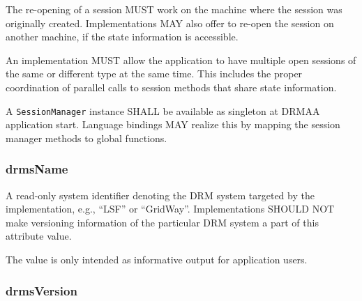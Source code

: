 \documentclass{article}
\newcommand{\h}[1]{\lstinline|#1|}
\newcommand{\langbind}[1]{\begin{shaded}#1\end{shaded}}
\newcommand{\rat}[1]{}
\begin{document}
The re-opening of a session MUST work on the machine where the session was originally created. Implementations MAY also offer to re-open the session on another machine, if the state information is accessible. 

An implementation MUST allow the application to have multiple open sessions of the same or different type at the same time. This includes the proper coordination of parallel calls to session methods that share state information.

\langbind{
A \h{SessionManager} instance SHALL be available as singleton at DRMAA application start. Language bindings MAY realize this by mapping the session manager methods to global functions. 
}

\rat{
Comparison to DRMAA 1.0:
The concept of a factory from GFD.130 was removed (solves issue \#6276). Version 2.0 of DRMAA supports restartable sessions by the newly introduced SessionManager interface. It allows creating multiple concurrent sessions for job submission (solves issue \#2821), which can be restarted by their generated session name (solves issue \#2820). Session.init() and Session.exit() functionalities are moved to the according session creation and closing routines. The descriptions were fixed accordingly (solves issue \#2822). The AlreadyActiveSession error was removed. (F2F meeting July 2009) The drmaaImplementation attribute from DRMAA 1.0 was removed, since it was redundant to the drmsInfo attribute. This one is now available in the new SessionManager interface. (F2F meeting July 2009).

The possibility for surviving job / reservation objects on session closing was added after discussion in the Nov 30th 2011 conf call.
}

\subsubsection{drmsName}

A read-only system identifier denoting the DRM system targeted by the implementation, e.g., \enquote{LSF} or \enquote{GridWay}. Implementations SHOULD NOT make versioning information of the particular DRM system a part of this attribute value.

The value is only intended as informative output for application users.

\subsubsection{drmsVersion}
\end{document}
